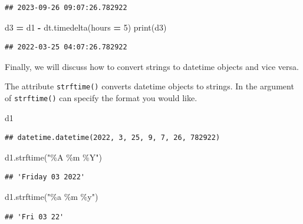 \documentclass[
]{book}
\newenvironment{Shaded}{\begin{snugshade}}{\end{snugshade}}
\newcommand{\BuiltInTok}[1]{#1}
\newcommand{\DecValTok}[1]{\textcolor[rgb]{0.00,0.00,0.81}{#1}}
\newcommand{\NormalTok}[1]{#1}
\newcommand{\OperatorTok}[1]{\textcolor[rgb]{0.81,0.36,0.00}{\textbf{#1}}}
\newcommand{\StringTok}[1]{\textcolor[rgb]{0.31,0.60,0.02}{#1}}
\begin{document}
\begin{verbatim}
## 2023-09-26 09:07:26.782922
\end{verbatim}

\begin{Shaded}
\begin{Highlighting}[]
\NormalTok{d3 }\OperatorTok{=}\NormalTok{ d1 }\OperatorTok{{-}}\NormalTok{ dt.timedelta(hours }\OperatorTok{=} \DecValTok{5}\NormalTok{)}
\BuiltInTok{print}\NormalTok{(d3)}
\end{Highlighting}
\end{Shaded}

\begin{verbatim}
## 2022-03-25 04:07:26.782922
\end{verbatim}

Finally, we will discuss how to convert strings to datetime objects and vice versa.

The attribute \texttt{strftime()} converts datetime objects to strings. In the argument of \texttt{strftime()} can specify the format you would like.

\begin{Shaded}
\begin{Highlighting}[]
\NormalTok{d1}
\end{Highlighting}
\end{Shaded}

\begin{verbatim}
## datetime.datetime(2022, 3, 25, 9, 7, 26, 782922)
\end{verbatim}

\begin{Shaded}
\begin{Highlighting}[]
\NormalTok{d1.strftime(}\StringTok{"\%A \%m \%Y"}\NormalTok{)}
\end{Highlighting}
\end{Shaded}

\begin{verbatim}
## 'Friday 03 2022'
\end{verbatim}

\begin{Shaded}
\begin{Highlighting}[]
\NormalTok{d1.strftime(}\StringTok{"\%a \%m \%y"}\NormalTok{)}
\end{Highlighting}
\end{Shaded}

\begin{verbatim}
## 'Fri 03 22'
\end{verbatim}
\end{document}
